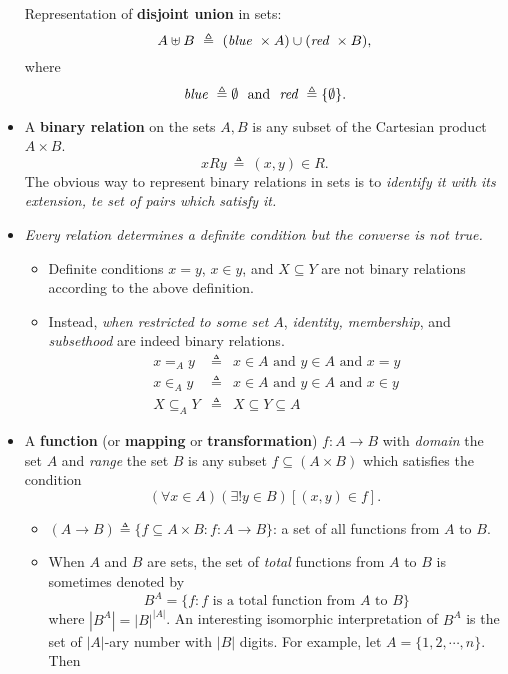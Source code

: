 \documentclass{myproc}
\begin{document}
\begin{itemize}
\w Representation of {\bf{}disjoint union} in sets:
	\[ A \uplus B \ \triangleq\  (\mbox{\em{}blue\ } \times A) \cup
		(\mbox{\em{}red\ } \times B), \]
	where
	\[ \mbox{\em{}blue\ } \triangleq \emptyset \mbox{\ \ and\ \ }
		\mbox{\em{}red\ } \triangleq \{\emptyset\}.\]
\item A {\bf{}binary relation} on the sets $A, B$ is any subset of
	the Cartesian product $A \times B$. 
	\[ xRy \ \triangleq\ (x, y) \in R. \]
	\bit
	\w The obvious way to represent binary relations in sets is
	to {\em{}identify it with its {\em{}extension\/},
	te set of pairs which satisfy it.\/}
	\eit
\item {\em{}Every relation determines a definite condition but 
	the converse is not true.\/}
	\begin{itemize}
	\item Definite conditions $x = y$, $x \in y$, and $X \subseteq Y$ are
		not binary relations according to the above definition.
	\item Instead, {\em when restricted to some set $A$}, 
		{\em{}identity, membership\/}, and {\em{}subsethood\/} are indeed
		binary relations.
		\begin{eqnarray*}
		x =_A y & \triangleq & x \in A \mbox{\ and\ } y \in A \mbox{\ and\ }
			x = y\\
		x \in_A y & \triangleq & x \in A \mbox{\ and\ } y \in A \mbox{\ and\ }
			x \in y\\
		X \subseteq_A Y & \triangleq & X \subseteq Y \subseteq A
		\end{eqnarray*}
	\end{itemize}
\item A {\bf{}function} (or {\bf{}mapping} or {\bf{}transformation})
	$f: A \rightarrow B$ with {\em{}domain\/} the set $A$ and 
	{\em{}range\/}
	the set $B$ is any subset $f \subseteq (A \times B)$ which satisfies
	the condition
		\[ (\forall{x}\in A)(\exists{!y \in B})[(x, y) \in f]. \]
		\begin{itemize}
		\item $(A \rightarrow B) \triangleq \{f \subseteq A \times B: 
			f: A \rightarrow B\}$: a set of all functions 
			from $A$ to
			$B$.
		\item When $A$ and $B$ are sets, the set
	of {\em{}total\/} functions from $A$ to $B$ is sometimes denoted by
	\[ B^A = \{f: f \mbox{\ is a total function from $A$ to $B$}\}\]
	where $|B^A| = |B|^{|A|}$.
	An interesting isomorphic interpretation of $B^A$ is the set of 
	$|A|$-ary number with $|B|$ digits.
	For example, let $A = \{1, 2, \cdots, n\}$. Then

\end{itemize}
\end{itemize}
\end{document}
